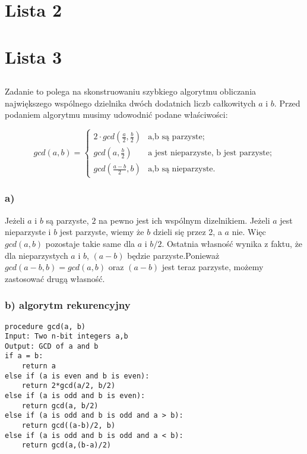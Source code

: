 \documentclass[svgnames]{report}
\begin{document}

\chapter{Lista 2}

\chapter{Lista 3}

\section{} %
Zadanie to polega na skonstruowaniu szybkiego algorytmu obliczania największego wspólnego dzielnika dwóch dodatnich liczb całkowitych $a$ i $b$. Przed podaniem algorytmu musimy udowodnić podane właściwości:

\begin{equation*}
gcd(a,b) =
 \begin{cases}
 2 \cdot gcd( \frac{a}{2}, \frac{b}{2}) & \text{a,b są parzyste;} \\
 gcd(a,\frac{b}{2}) & \text{a jest nieparzyste, b jest parzyste;} \\
 gcd(\frac{a-b}{2},b) & \text{a,b są nieparzyste.}
 \end{cases}
 \end{equation*}

\subsection{a)}
Jeżeli $a$ i $b$ są parzyste, $2$ na pewno jest ich wspólnym dizelnikiem. Jeżeli $a$ jest nieparzyste i $b$ jest parzyste, wiemy że $b$ dzieli się przez 2, a $a$ nie. Więc $gcd(a,b)$ pozostaje takie same dla $a$ i $b/2$. Ostatnia własność wynika z faktu, że dla nieparzystych $a$ i $b$, $(a-b)$ będzie parzyste.Ponieważ $gcd(a-b,b) = gcd(a,b)$ oraz $(a-b)$ jest teraz parzyste, możemy zastosować drugą własność.

\subsection{b) algorytm rekurencyjny}
\begin{lstlisting}
procedure gcd(a, b)
Input: Two n-bit integers a,b
Output: GCD of a and b
if a = b:
	return a
else if (a is even and b is even):
	return 2*gcd(a/2, b/2)
else if (a is odd and b is even):
	return gcd(a, b/2)
else if (a is odd and b is odd and a > b):
	return gcd((a-b)/2, b)
else if (a is odd and b is odd and a < b):
	return gcd(a,(b-a)/2)
\end{lstlisting}
\end{document}
